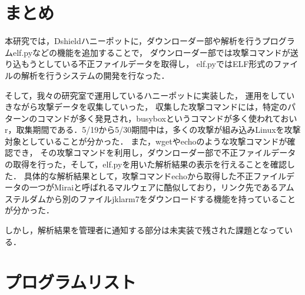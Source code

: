 \documentclass[dvipdfmx]{bta}
\begin{document}

\chapter{まとめ}

本研究では，Dshieldハニーポットに，ダウンローダー部や解析を行うプログラムelf.pyなどの機能を追加することで，
ダウンローダー部では攻撃コマンドが送り込もうとしている不正ファイルデータを取得し，
elf.pyではELF形式のファイルの解析を行うシステムの開発を行なった．

そして，我々の研究室で運用しているハニーポットに実装した，
運用をしていきながら攻撃データを収集していった，
収集した攻撃コマンドには，特定のパターンのコマンドが多く発見され，busyboxというコマンドが多く使われておいr，取集期間である．5/19から5/30期間中は，多くの攻撃が組み込みLinuxを攻撃対象としていることが分かった．
また，wgetやechoのような攻撃コマンドが確認でき，
その攻撃コマンドを利用し，ダウンローダー部で不正ファイルデータの取得を行った，そして，elf.pyを用いた解析結果の表示を行えることを確認した．
具体的な解析結果として，攻撃コマンドechoから取得した不正ファイルデータの一つがMiraiと呼ばれるマルウェアに酷似しており，リンク先であるアムステルダムから別のファイルjklarm7をダウンロードする機能を持っていることが分かった．

しかし，解析結果を管理者に通知する部分は未実装で残された課題となっている．

%



\appendix

\chapter{プログラムリスト}


\end{document}

